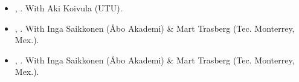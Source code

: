 \begin{itemize}


  	 \item[\textcolor{gray}{\textbullet}] \href{https://raw.githubusercontent.com/hbahamonde/Inequality_Populism_Finland/main/abstract.txt}{\unskip}, {\bf \emph{\unskip}}. With Aki Koivula (UTU).

 	\item[\textcolor{gray}{\textbullet}] \href{https://raw.githubusercontent.com/hbahamonde/Users/hectorbahamonde/research/democratic_backsliding/Paper_1/main/abstract.txt}{\unskip}, {\bf \emph{\unskip}}. With Inga Saikkonen (\AA bo Akademi) \& Mart Trasberg (Tec. Monterrey, Mex.).

 	\item[\textcolor{gray}{\textbullet}] \href{https://raw.githubusercontent.com/hbahamonde/Users/hectorbahamonde/research/democratic_backsliding/Paper_2/main/abstract.txt}{\unskip}, {\bf \emph{\unskip}}. With Inga Saikkonen (\AA bo Akademi) \& Mart Trasberg (Tec. Monterrey, Mex.).







\end{itemize}
